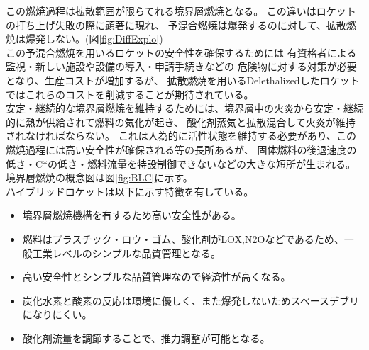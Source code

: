 この燃焼過程は拡散範囲が限らてれる境界層燃焼となる。
この違いはロケットの打ち上げ失敗の際に顕著に現れ、
予混合燃焼は爆発するのに対して、拡散燃焼は爆発しない。(図\ref{fig:DiffExplo})
\\
この予混合燃焼を用いるロケットの安全性を確保するためには
有資格者による監視・新しい施設や設備の導入・申請手続きなどの
危険物に対する対策が必要となり、生産コストが増加するが、
拡散燃焼を用いるDelethalizedしたロケットではこれらのコストを削減することが期待されている。
\\
安定・継続的な境界層燃焼を維持するためには、境界層中の火炎から安定・継続的に熱が供給されて燃料の気化が起き、
酸化剤蒸気と拡散混合して火炎が維持されなければならない。
これは人為的に活性状態を維持する必要があり、この燃焼過程には高い安全性が確保される等の長所あるが、
固体燃料の後退速度の低さ・C*の低さ・燃料流量を特設制御できないなどの大きな短所が生まれる。
境界層燃焼の概念図は図\ref{fig:BLC}に示す。
\\
ハイブリッドロケットは以下に示す特徴を有している。
\begin{itemize}
	\item 境界層燃焼機構を有するため高い安全性がある。
	\item 燃料はプラスチック・ロウ・ゴム、酸化剤がLOX,N2Oなどであるため、一般工業レベルのシンプルな品質管理となる。
	\item 高い安全性とシンプルな品質管理なので経済性が高くなる。
	\item 炭化水素と酸素の反応は環境に優しく、また爆発しないためスペースデブリになりにくい。
	\item 酸化剤流量を調節することで、推力調整が可能となる。
\end{itemize}



